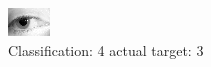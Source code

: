 \begin{figure}[h!]
\begin{center}
\includegraphics[width=0.60\columnwidth]{figures/ID1370_class_4_target_3.png}
\end{center}
\caption{ Classification: 4 actual target: 3}
\label{fig:ID1370_class_4_target_3}
\end{figure}
